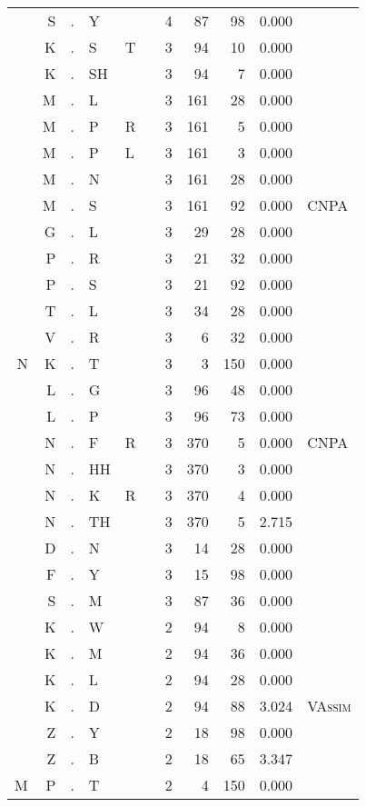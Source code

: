 \begin{longtable}{r@{ } r@{ } c@{ } l@{ } l@{ } l@{ } r r r r l }
 & S & . & Y &  &  & 4 & 87 & 98 & 0.000 &  \\
 & K & . & S & T &  & 3 & 94 & 10 & 0.000 &  \\
 & K & . & SH &  &  & 3 & 94 & 7 & 0.000 &  \\
 & M & . & L &  &  & 3 & 161 & 28 & 0.000 &  \\
 & M & . & P & R &  & 3 & 161 & 5 & 0.000 &  \\
 & M & . & P & L &  & 3 & 161 & 3 & 0.000 &  \\
 & M & . & N &  &  & 3 & 161 & 28 & 0.000 &  \\
 & M & . & S &  &  & 3 & 161 & 92 & 0.000 & \textsc{CNPA} \\
 & G & . & L &  &  & 3 & 29 & 28 & 0.000 &  \\
 & P & . & R &  &  & 3 & 21 & 32 & 0.000 &  \\
 & P & . & S &  &  & 3 & 21 & 92 & 0.000 &  \\
 & T & . & L &  &  & 3 & 34 & 28 & 0.000 &  \\
 & V & . & R &  &  & 3 & 6 & 32 & 0.000 &  \\
N & K & . & T &  &  & 3 & 3 & 150 & 0.000 &  \\
 & L & . & G &  &  & 3 & 96 & 48 & 0.000 &  \\
 & L & . & P &  &  & 3 & 96 & 73 & 0.000 &  \\
 & N & . & F & R &  & 3 & 370 & 5 & 0.000 & \textsc{CNPA} \\
 & N & . & HH &  &  & 3 & 370 & 3 & 0.000 &  \\
 & N & . & K & R &  & 3 & 370 & 4 & 0.000 &  \\
 & N & . & TH &  &  & 3 & 370 & 5 & 2.715 &  \\
 & D & . & N &  &  & 3 & 14 & 28 & 0.000 &  \\
 & F & . & Y &  &  & 3 & 15 & 98 & 0.000 &  \\
 & S & . & M &  &  & 3 & 87 & 36 & 0.000 &  \\
 & K & . & W &  &  & 2 & 94 & 8 & 0.000 &  \\
 & K & . & M &  &  & 2 & 94 & 36 & 0.000 &  \\
 & K & . & L &  &  & 2 & 94 & 28 & 0.000 &  \\
 & K & . & D &  &  & 2 & 94 & 88 & 3.024 & \textsc{VAssim} \\
 & Z & . & Y &  &  & 2 & 18 & 98 & 0.000 &  \\
 & Z & . & B &  &  & 2 & 18 & 65 & 3.347 &  \\
M & P & . & T &  &  & 2 & 4 & 150 & 0.000 &  \\

\end{longtable}
